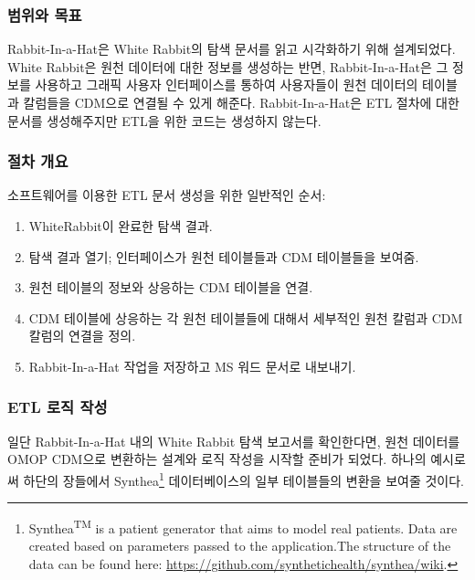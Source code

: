 \documentclass[11pt]{book}
\providecommand{\tightlist}{%
  \setlength{\itemsep}{0pt}\setlength{\parskip}{0pt}}
\let\rmarkdownfootnote\footnote%
\def\footnote{\protect\rmarkdownfootnote}
\theoremstyle{definition}
\theoremstyle{definition}
\theoremstyle{definition}
\theoremstyle{remark}
\begin{document}
\subsubsection*{범위와 목표}\label{--1}

Rabbit-In-a-Hat은 White Rabbit의 탐색 문서를 읽고 시각화하기 위해
설계되었다. White Rabbit은 원천 데이터에 대한 정보를 생성하는 반면,
Rabbit-In-a-Hat은 그 정보를 사용하고 그래픽 사용자 인터페이스를 통하여
사용자들이 원천 데이터의 테이블과 칼럼들을 CDM으로 연결될 수 있게
해준다. Rabbit-In-a-Hat은 ETL 절차에 대한 문서를 생성해주지만 ETL을 위한
코드는 생성하지 않는다.

\subsubsection*{절차 개요}\label{--1}

소프트웨어를 이용한 ETL 문서 생성을 위한 일반적인 순서:

\begin{enumerate}
\def\labelenumi{\arabic{enumi}.}
\tightlist
\item
  WhiteRabbit이 완료한 탐색 결과.
\item
  탐색 결과 열기; 인터페이스가 원천 테이블들과 CDM 테이블들을 보여줌.
\item
  원천 테이블의 정보와 상응하는 CDM 테이블을 연결.
\item
  CDM 테이블에 상응하는 각 원천 테이블들에 대해서 세부적인 원천 칼럼과
  CDM 칼럼의 연결을 정의.
\item
  Rabbit-In-a-Hat 작업을 저장하고 MS 워드 문서로 내보내기.
\end{enumerate}

\subsubsection*{ETL 로직 작성}\label{etl--}

일단 Rabbit-In-a-Hat 내의 White Rabbit 탐색 보고서를 확인한다면, 원천
데이터를 OMOP CDM으로 변환하는 설계와 로직 작성을 시작할 준비가 되었다.
하나의 예시로써 하단의 장들에서 Synthea\footnote{Synthea\textsuperscript{TM}
  is a patient generator that aims to model real patients. Data are
  created based on parameters passed to the application.The structure of
  the data can be found here:
  \url{https://github.com/synthetichealth/synthea/wiki}.} 데이터베이스의
일부 테이블들의 변환을 보여줄 것이다.
\end{document}
